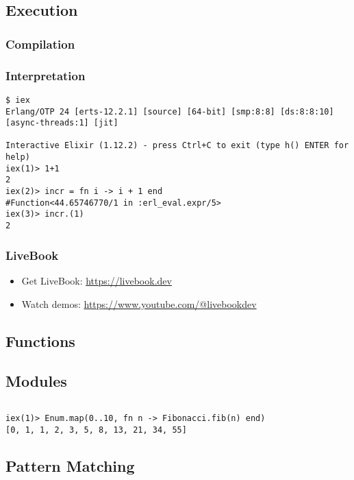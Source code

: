 {\subsection{Execution}
\subsubsection{Compilation}
\subsubsection{Interpretation}

\begin{verbatim}
$ iex
Erlang/OTP 24 [erts-12.2.1] [source] [64-bit] [smp:8:8] [ds:8:8:10] [async-threads:1] [jit]

Interactive Elixir (1.12.2) - press Ctrl+C to exit (type h() ENTER for help)
iex(1)> 1+1
2
iex(2)> incr = fn i -> i + 1 end
#Function<44.65746770/1 in :erl_eval.expr/5>
iex(3)> incr.(1)
2
\end{verbatim}

\subsubsection{LiveBook}

\begin{itemize}
  \item Get LiveBook: \url{https://livebook.dev}
  \item Watch demos: \url{https://www.youtube.com/@livebookdev}
\end{itemize}

\subsection{Functions}

\subsection{Modules}

\inputminted[fontsize=\normalsize]{elixir}{../src/elixir/fibonacci.ex}

\begin{verbatim}
iex(1)> Enum.map(0..10, fn n -> Fibonacci.fib(n) end)
[0, 1, 1, 2, 3, 5, 8, 13, 21, 34, 55]
\end{verbatim}

\subsection{Pattern Matching}

}
